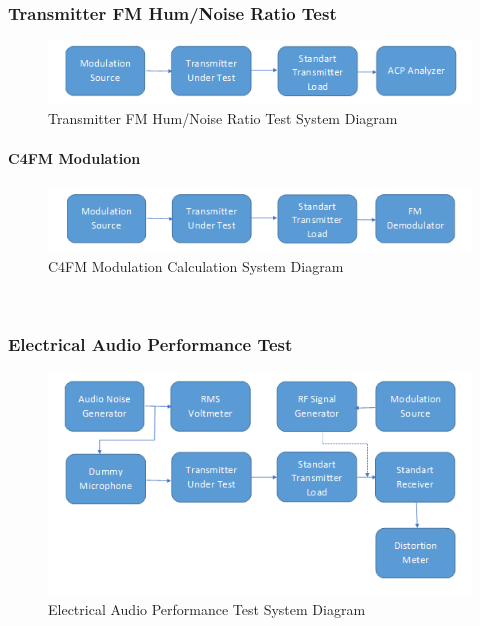 \subsubsection{Transmitter FM Hum/Noise Ratio Test}
\- \indent


\begin{figure}[H]
	\center
	\setlength{\unitlength}{\textwidth} 
	\includegraphics[width=1.0\unitlength]{transnoise}
	\caption{\label{fig:transnoise}Transmitter FM Hum/Noise Ratio Test System Diagram }
\end{figure}


\paragraph{C4FM Modulation }
\- \indent

\begin{figure}[H]
	\center
	\setlength{\unitlength}{\textwidth} 
	\includegraphics[width=1.0\unitlength]{c4fmmod}
	\caption{\label{fig:c4fmmod}C4FM Modulation Calculation System Diagram }
\end{figure}

\- \\ \- \vfill

\subsubsection{Electrical Audio Performance Test}
\- \indent


\begin{figure}[H]
	\center
	\setlength{\unitlength}{\textwidth} 
	\includegraphics[width=1.0\unitlength]{elecaudio}
	\caption{\label{fig:elecaudio}Electrical Audio Performance Test System Diagram }
\end{figure}

